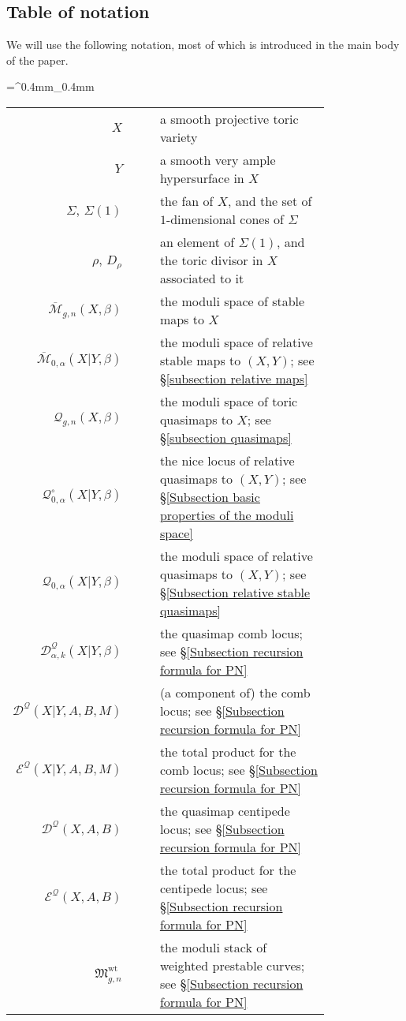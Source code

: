 \documentclass[10pt]{amsart}
\newcommand{\M}[4]{\overline{\mathcal{M}}_{#1,#2}(#3,#4)}
\newcommand{\Q}[4]{\mathcal{Q}_{#1,#2}(#3,#4)}
\newcommand{\MM}{\mathfrak M}
\theoremstyle{definition}
\theoremstyle{definition}
\begin{document}
\subsection{Table of notation} We will use the following notation, most of which is introduced in the main body of the paper.\medskip

\tabulinesep=^0.4mm_0.4mm
\begin{tabu}{r c c p{0.8\linewidth}}
$X$ & & & a smooth projective toric variety \\
$Y$ & & & a smooth very ample hypersurface in $X$ \\
$\Sigma$, $\Sigma(1)$ & & & the fan of $X$, and the set of $1$-dimensional cones of $\Sigma$ \\
$\rho$, $D_\rho$ & & & an element of $\Sigma(1)$, and the toric divisor in $X$ associated to it \\
$\M{g}{n}{X}{\beta}$ & & & the moduli space of stable maps to $X$ \\
$\M{0}{\alpha}{X|Y}{\beta}$ & & & the moduli space of relative stable maps to $(X,Y)$; see \S \ref{subsection relative maps} \\
$\Q{g}{n}{X}{\beta}$ & & & the moduli space of toric quasimaps to $X$; see \S \ref{subsection quasimaps} \\
$\mathcal{Q}^{\circ}_{0,\alpha}(X|Y,\beta)$ & & & the nice locus of relative quasimaps to $(X,Y)$; see \S \ref{Subsection basic properties of the moduli space} \\
$\Q{0}{\alpha}{X|Y}{\beta}$ & & & the moduli space of relative quasimaps to $(X,Y)$; see \S \ref{Subsection relative stable quasimaps} \\
$\mathcal{D}^{\mathcal{Q}}_{\alpha,k}(X|Y,\beta)$ & & & the quasimap comb locus; see \S \ref{Subsection recursion formula for PN} \\
$\mathcal{D}^{\mathcal{Q}}(X|Y,A,B,M)$ & & & (a component of) the comb locus; see \S \ref{Subsection recursion formula for PN} \\
$\mathcal{E}^{\mathcal{Q}}(X|Y,A,B,M)$ & & & the total product for the comb locus; see \S \ref{Subsection recursion formula for PN} \\
$\mathcal{D}^{\mathcal{Q}}(X,A,B)$ & & & the quasimap centipede locus; see \S \ref{Subsection recursion formula for PN} \\
$\mathcal{E}^{\mathcal{Q}}(X,A,B)$ & & & the total product for the centipede locus; see \S \ref{Subsection recursion formula for PN} \\
$\MM^{\operatorname{wt}}_{g,n}$ & & & the moduli stack of weighted prestable curves; see \S \ref{Subsection recursion formula for PN} \\

\end{tabu}
\end{document}
